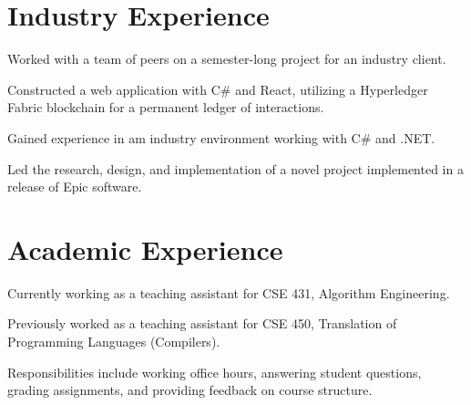 \documentclass[]{deedy-resume-openfont-rileyannis}
\begin{document}
\begin{minipage}[t]{0.66\textwidth} 


\section{Industry Experience}

\vspace{\topsep} %
\begin{tightemize}
\item Worked with a team of peers on a semester-long project for an industry client.
\item Constructed a web application with C\# and React, utilizing a Hyperledger Fabric blockchain for a permanent ledger of interactions.
\end{tightemize}
\sectionsep

\begin{tightemize}
\item Gained experience in am industry environment working with C\# and .NET.
\item Led the research, design, and implementation of a novel project implemented in a release of Epic software.
\end{tightemize}
\sectionsep


\section{Academic Experience}


\begin{tightemize}
\item Currently working as a teaching assistant for CSE 431, Algorithm Engineering.
\item Previously worked as a teaching assistant for CSE 450, Translation of Programming Languages (Compilers).
\item Responsibilities include working office hours, answering student questions, grading assignments, and providing feedback on course structure.
\end{tightemize}
\sectionsep


\end{minipage}
\end{document}
